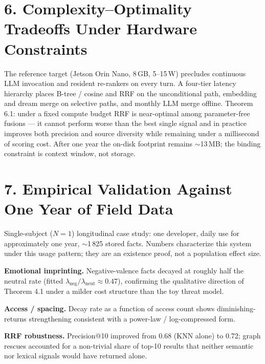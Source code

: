 \documentclass[]{article}
\begin{document}
\hypertarget{complexityoptimality-tradeoffs-under-hardware-constraints}{%
\section{\texorpdfstring{\textbf{6. Complexity--Optimality Tradeoffs
Under Hardware
Constraints}}{6. Complexity--Optimality Tradeoffs Under Hardware Constraints}}\label{complexityoptimality-tradeoffs-under-hardware-constraints}}

The reference target (Jetson Orin Nano, 8\,GB, 5--15\,W) precludes continuous
LLM invocation and resident re-rankers on every turn. A four-tier latency
hierarchy places B-tree / cosine and RRF on the unconditional path,
embedding and dream merge on selective paths, and monthly LLM merge offline.
Theorem 6.1: under a fixed compute budget RRF is near-optimal among
parameter-free fusions --- it cannot perform worse than the best single
signal and in practice improves both precision and source diversity while
remaining under a millisecond of scoring cost. After one year the on-disk
footprint remains \(\sim\)13\,MB; the binding constraint is context window,
not storage.

\hypertarget{empirical-validation-against-one-year-of-field-data}{%
\section{\texorpdfstring{\textbf{7. Empirical Validation Against One
Year of Field
Data}}{7. Empirical Validation Against One Year of Field Data}}\label{empirical-validation-against-one-year-of-field-data}}

Single-subject (\(N=1\)) longitudinal case study: one developer, daily use
for approximately one year, \(\sim\)1\,825 stored facts. Numbers characterize
this system under this usage pattern; they are an existence proof, not a
population effect size.

\textbf{Emotional imprinting.} Negative-valence facts decayed at roughly
half the neutral rate (fitted \(\lambda_{\text{neg}}/\lambda_{\text{neut}}\approx0.47\)),
confirming the qualitative direction of Theorem 4.1 under a milder cost
structure than the toy threat model.

\textbf{Access / spacing.} Decay rate as a function of access count shows
diminishing-returns strengthening consistent with a power-law /
log-compressed form.

\textbf{RRF robustness.} Precision@10 improved from 0.68 (KNN alone) to
0.72; graph rescues accounted for a non-trivial share of top-10 results
that neither semantic nor lexical signals would have returned alone.
\end{document}
